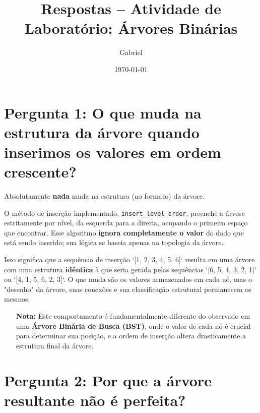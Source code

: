 \documentclass[12pt, a4paper]{article}
\title{Respostas -- Atividade de Laboratório: Árvores Binárias}
\author{Gabriel}
\date{\today}
\begin{document}
\maketitle %
\thispagestyle{empty} %
\vspace{2cm} %

\section*{Pergunta 1: O que muda na estrutura da árvore quando inserimos os valores em ordem crescente?}

Absolutamente \textbf{nada} muda na estrutura (no formato) da árvore.

O método de inserção implementado, \texttt{insert\_level\_order}, preenche a árvore estritamente por nível, da esquerda para a direita, ocupando o primeiro espaço que encontrar. Esse algoritmo \textbf{ignora completamente o valor} do dado que está sendo inserido; sua lógica se baseia apenas na topologia da árvore.

Isso significa que a sequência de inserção `[1, 2, 3, 4, 5, 6]` resulta em uma árvore com uma estrutura \textbf{idêntica} à que seria gerada pelas sequências `[6, 5, 4, 3, 2, 1]` ou `[4, 1, 5, 6, 2, 3]`. O que muda são os valores armazenados em cada nó, mas o "desenho" da árvore, suas conexões e sua classificação estrutural permanecem os mesmos.

\begin{itemize}
    \item[\textbf{Nota:}] Este comportamento é fundamentalmente diferente do observado em uma \textbf{Árvore Binária de Busca (BST)}, onde o valor de cada nó é crucial para determinar sua posição, e a ordem de inserção altera drasticamente a estrutura final da árvore.
\end{itemize}


\section*{Pergunta 2: Por que a árvore resultante não é perfeita?}
\end{document}
